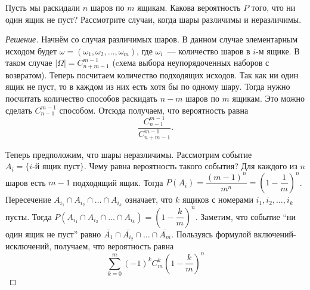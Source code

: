 \documentclass[a4paper,12pt]{article}
\begin{document}
\begin{problem}
	Пусть мы раскидали \(n\) шаров по \(m\) ящикам. Какова вероятность \(P\) того, что ни один ящик не пуст? Рассмотрите случаи, когда шары различимы и неразличимы.
\end{problem}
\begin{proof}[Решение]
	Начнём со случая различимых шаров. В данном случае элементарным исходом будет \(\omega = (\omega_1, \omega_2, \ldots, \omega_m)\), где \(\omega_i\)~--- количество шаров в \(i\)-м ящике. В таком случае \(|\Omega| = C_{n + m - 1}^{m - 1}\) (cхема выбора неупорядоченных наборов с возвратом). Теперь посчитаем количество подходящих исходов. Так как ни один ящик не пуст, то в каждом из них есть хотя бы по одному шару. Тогда нужно посчитать количество способов раскидать \(n - m\) шаров по \(m\) ящикам. Это можно сделать \(C_{n - 1}^{m - 1}\) способом. Отсюда получаем, что вероятность равна \[\dfrac{C_{n - 1}^{m - 1}}{C_{n + m - 1}^{m - 1}}.\]
	
	Теперь предположим, что шары неразличимы. Рассмотрим событие \(A_i = \{i\text{-й ящик пуст}\}\). Чему равна вероятность такого события? Для каждого из \(n\) шаров есть \(m - 1\) подходящий ящик. Тогда \(P(A_i) = \dfrac{(m - 1)^n}{m^n} = \left(1 - \dfrac{1}{m}\right)^n\). Пересечение \(A_{i_1} \cap A_{i_2} \cap \ldots \cap A_{i_k}\) означает, что \(k\) ящиков с номерами \(i_1, i_2,\ldots, i_k\) пусты. Тогда \(P(A_{i_1} \cap A_{i_2} \cap \ldots \cap A_{i_k}) = \left(1 - \dfrac{k}{m}\right)^n\). Заметим, что событие ``ни один ящик не пуст'' равно \(\overline{A_{1}} \cap \overline{A_{i_2}} \cap \ldots \cap \overline{A_{m}}\). Пользуясь формулой включений-исключений, получаем, что вероятность равна
	\[\sum_{k = 0}^{m}(-1)^{k}C_{m}^{k}\left(1 - \frac{k}{m}\right)^{n}\]
\end{proof}
\end{document}

